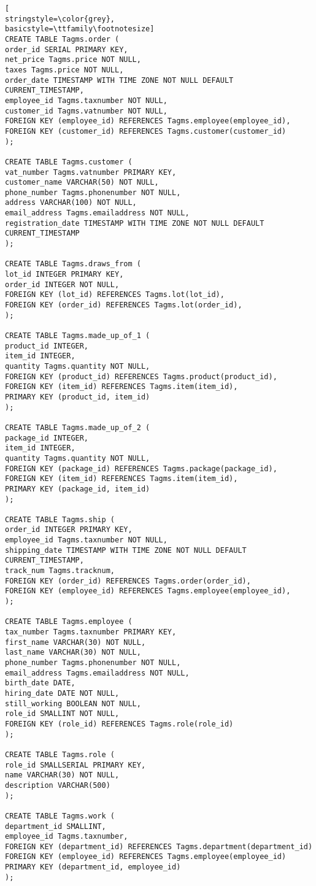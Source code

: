 \begin{lstlisting}[
stringstyle=\color{grey},
basicstyle=\ttfamily\footnotesize]
CREATE TABLE Tagms.order (
order_id SERIAL PRIMARY KEY,
net_price Tagms.price NOT NULL,
taxes Tagms.price NOT NULL,
order_date TIMESTAMP WITH TIME ZONE NOT NULL DEFAULT CURRENT_TIMESTAMP,
employee_id Tagms.taxnumber NOT NULL,
customer_id Tagms.vatnumber NOT NULL,
FOREIGN KEY (employee_id) REFERENCES Tagms.employee(employee_id),
FOREIGN KEY (customer_id) REFERENCES Tagms.customer(customer_id)
);

CREATE TABLE Tagms.customer (
vat_number Tagms.vatnumber PRIMARY KEY,
customer_name VARCHAR(50) NOT NULL,
phone_number Tagms.phonenumber NOT NULL,
address VARCHAR(100) NOT NULL,
email_address Tagms.emailaddress NOT NULL,
registration_date TIMESTAMP WITH TIME ZONE NOT NULL DEFAULT CURRENT_TIMESTAMP
);

CREATE TABLE Tagms.draws_from (
lot_id INTEGER PRIMARY KEY,
order_id INTEGER NOT NULL,
FOREIGN KEY (lot_id) REFERENCES Tagms.lot(lot_id),
FOREIGN KEY (order_id) REFERENCES Tagms.lot(order_id),
);

CREATE TABLE Tagms.made_up_of_1 (
product_id INTEGER,
item_id INTEGER,
quantity Tagms.quantity NOT NULL,
FOREIGN KEY (product_id) REFERENCES Tagms.product(product_id),
FOREIGN KEY (item_id) REFERENCES Tagms.item(item_id),
PRIMARY KEY (product_id, item_id)
);

CREATE TABLE Tagms.made_up_of_2 (
package_id INTEGER,
item_id INTEGER,
quantity Tagms.quantity NOT NULL,
FOREIGN KEY (package_id) REFERENCES Tagms.package(package_id),
FOREIGN KEY (item_id) REFERENCES Tagms.item(item_id),
PRIMARY KEY (package_id, item_id)
);

CREATE TABLE Tagms.ship (
order_id INTEGER PRIMARY KEY,
employee_id Tagms.taxnumber NOT NULL,
shipping_date TIMESTAMP WITH TIME ZONE NOT NULL DEFAULT CURRENT_TIMESTAMP,
track_num Tagms.tracknum,
FOREIGN KEY (order_id) REFERENCES Tagms.order(order_id),
FOREIGN KEY (employee_id) REFERENCES Tagms.employee(employee_id),
);

CREATE TABLE Tagms.employee (
tax_number Tagms.taxnumber PRIMARY KEY,
first_name VARCHAR(30) NOT NULL,
last_name VARCHAR(30) NOT NULL,
phone_number Tagms.phonenumber NOT NULL,
email_address Tagms.emailaddress NOT NULL,
birth_date DATE,
hiring_date DATE NOT NULL,
still_working BOOLEAN NOT NULL,
role_id SMALLINT NOT NULL,
FOREIGN KEY (role_id) REFERENCES Tagms.role(role_id)
);

CREATE TABLE Tagms.role (
role_id SMALLSERIAL PRIMARY KEY,
name VARCHAR(30) NOT NULL,
description VARCHAR(500)
);

CREATE TABLE Tagms.work (
department_id SMALLINT,
employee_id Tagms.taxnumber,
FOREIGN KEY (department_id) REFERENCES Tagms.department(department_id)
FOREIGN KEY (employee_id) REFERENCES Tagms.employee(employee_id)
PRIMARY KEY (department_id, employee_id)
);


\end{lstlisting}

